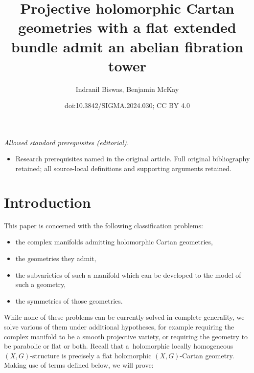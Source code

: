 \documentclass[10pt,a4paper]{amsart}
\title{Projective holomorphic Cartan geometries with a flat extended bundle admit an abelian fibration tower}
\author{Indranil Biswas, Benjamin McKay}
\date{doi:10.3842/SIGMA.2024.030; CC BY 4.0}
\numberwithin{equation}{section}
\begin{document}
\maketitle
\noindent\textit{Allowed standard prerequisites (editorial).}\begin{itemize}
\item Research prerequisites named in the original article. Full original bibliography retained; all source-local definitions and supporting arguments retained.
\end{itemize}\medskip
\section{Introduction}

This paper is concerned with the following classification problems:
\begin{itemize}\itemsep=0pt
\item
the complex manifolds admitting holomorphic Cartan geometries,
\item
the geometries they admit,
\item
the subvarieties of such a manifold which can be developed to the model of such a geometry,
\item
the symmetries of those geometries.
\end{itemize}
While none of these problems can be currently solved in complete generality, we solve various of them under additional hypotheses, for example requiring the complex manifold to be a smooth projective variety, or requiring the geometry to be parabolic or flat or both.
Recall that a~holomorphic locally homogeneous $(X, G)$-structure is precisely a flat holomorphic $(X, G)$-Cartan geometry.
Making use of terms defined below, we will prove:
\end{document}
